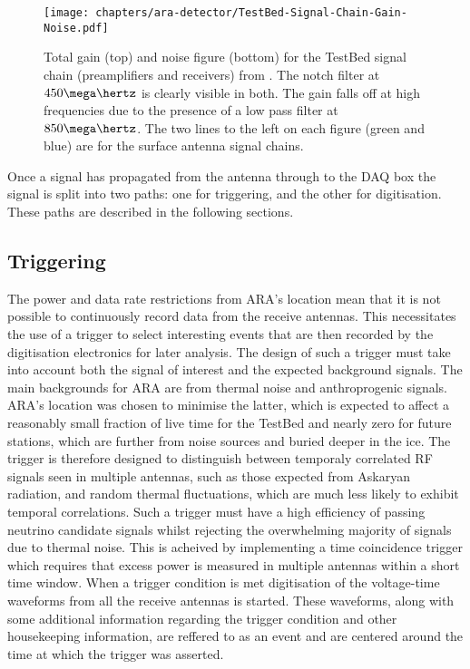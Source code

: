 \begin{figure}[htpb]
  \centering
  \texttt{[image: chapters/ara-detector/TestBed-Signal-Chain-Gain-Noise.pdf]}
  \caption{Total gain (top) and noise figure (bottom) for the TestBed signal chain (preamplifiers and receivers) from \cite{Allison2012457}. The notch filter at $450 \mega\hertz$ is clearly visible in both. The gain falls off at high frequencies due to the presence of a low pass filter at $850 \mega \hertz$. The two lines to the left on each figure (green and blue) are for the surface antenna signal chains.}
  \label{fig:ara-detector:TestBed:Signal-Chain:Gain-Noise}
\end{figure}

Once a signal has propagated from the antenna through to the DAQ box the signal is split into two paths: one for triggering, and the other for digitisation. These paths are described in the following sections.

\subsection{Triggering}
\label{sec:ara-detector:TestBed:Triggering}

The power and data rate restrictions from ARA's location mean that it is not possible to continuously record data from the receive antennas. This necessitates the use of a trigger to select interesting events that are then recorded by the digitisation electronics for later analysis. The design of such a trigger must take into account both the signal of interest and the expected background signals. The main backgrounds for ARA are from thermal noise and anthroprogenic signals. ARA's location was chosen to minimise the latter, which is expected to affect a reasonably small fraction of live time for the TestBed and nearly zero for future stations, which are further from noise sources and buried deeper in the ice. The trigger is therefore designed to distinguish between temporaly correlated RF signals seen in multiple antennas, such as those expected from Askaryan radiation, and random thermal fluctuations, which are much less likely to exhibit temporal correlations. Such a trigger must have a high efficiency of passing neutrino candidate signals whilst rejecting the overwhelming majority of signals due to thermal noise. This is acheived by implementing a time coincidence trigger which requires that excess power is measured in multiple antennas within a short time window. When a trigger condition is met digitisation of the voltage-time waveforms from all the receive antennas is started. These waveforms, along with some additional information regarding the trigger condition and other housekeeping information, are reffered to as an event and are centered around the time at which the trigger was asserted.


